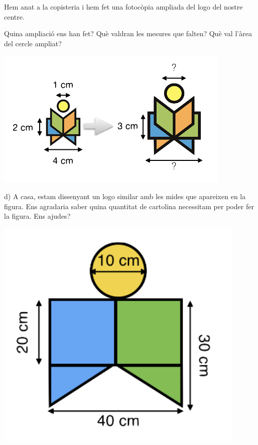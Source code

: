 \begin{iniaval}
	
    \begin{minipage}{0.6\textwidth}
			Hem anat a la copisteria i hem fet una fotocòpia ampliada del logo del nostre centre.
			
			\begin{tasks}
			 \task Quina ampliació ens han fet?
			 \task Què valdran les mesures que falten?
			 \task Què val l'àrea del cercle ampliat?
			 \end{tasks}
	\end{minipage}
	\begin{minipage}{0.4\textwidth}
		\centering
			\includegraphics[width=\textwidth]{img-09/ampliacio1}
	\end{minipage}
	 
	 \vso\vso
	
	 \begin{minipage}{0.65\textwidth}
	  d) A casa, estam dissenyant un logo similar amb les mides que apareixen en la figura. Ens agradaria saber quina quantitat de cartolina necessitam per poder fer la figura.  Ens ajudes?

	 \end{minipage}
	 \begin{minipage}{0.35\textwidth}
	 	\centering
	 	\includegraphics[width=0.9\textwidth]{img-09/ampliacio2}
	 \end{minipage}
	 \vsoo
	 

\end{iniaval}
